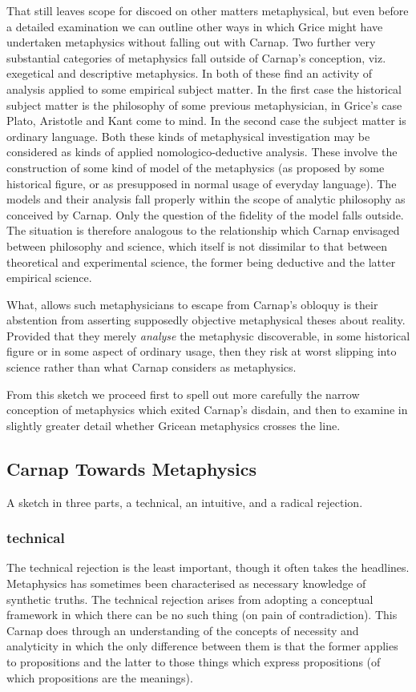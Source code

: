 \documentclass[10pt,titlepage]{book}
\begin{document}
That still leaves scope for discoed on other matters metaphysical, but even before a detailed examination we can outline other ways in which Grice might have undertaken metaphysics without falling out with Carnap.
Two further very substantial categories of metaphysics fall outside of Carnap's conception, viz. exegetical and descriptive metaphysics.
In both of these find an activity of analysis applied to some empirical subject matter.
In the first case the historical subject matter is the philosophy of some previous metaphysician, in Grice's case Plato, Aristotle and Kant come to mind.
In the second case the subject matter is ordinary language.
Both these kinds of metaphysical investigation may be considered as kinds of applied nomologico-deductive analysis.
These involve the construction of some kind of model of the metaphysics (as proposed by some historical figure, or as presupposed in normal usage of everyday language).
The models and their analysis fall properly within the scope of analytic philosophy as conceived by Carnap.
Only the question of the fidelity of the model falls outside.
The situation is therefore analogous to the relationship which Carnap envisaged between philosophy and science, which itself is not dissimilar to that between theoretical and experimental science, the former being deductive and the latter empirical science.

What, allows such metaphysicians to escape from Carnap's obloquy is their abstention from asserting supposedly objective metaphysical theses about reality.
Provided that they merely {\it analyse} the metaphysic discoverable, in some historical figure or in some aspect of ordinary usage, then they risk at worst slipping into science rather than what Carnap considers as metaphysics.

From this sketch we proceed first to spell out more carefully the narrow conception of metaphysics which exited Carnap's disdain, and then to examine in slightly greater detail whether Gricean metaphysics crosses the line.

\subsection{Carnap Towards Metaphysics}

A sketch in three parts, a technical, an intuitive, and a radical rejection.

\subsubsection{technical}
The technical rejection is the least important, though it often takes the headlines.
Metaphysics has sometimes been characterised as necessary knowledge of synthetic truths.
The technical rejection arises from adopting a conceptual framework in which there can be no such thing (on pain of contradiction).
This Carnap does through an understanding of the concepts of necessity and analyticity in which the only difference between them is that the former applies to propositions and the latter to those things which express propositions (of which propositions are the meanings).
\end{document}
